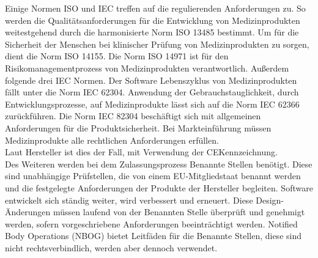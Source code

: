 Einige Normen ISO und IEC treffen auf die regulierenden Anforderungen zu.
So werden die Qualitätsanforderungen für die Entwicklung von Medizinprodukten weitestgehend durch die harmonisierte Norm ISO 13485 bestimmt. 
Um für die Sicherheit der Menschen bei klinischer Prüfung von Medizinprodukten zu sorgen, dient die Norm ISO 14155.
Die Norm ISO 14971 ist für den Risikomanagementprozess von Medizinprodukten verantwortlich.
Außerdem folgende drei IEC Normen.
Der Software Lebenszyklus von Medizinprodukten fällt unter die Norm IEC 62304. 
Anwendung der Gebrauchstauglichkeit, durch Entwicklungsprozesse,
auf Medizinprodukte lässt sich auf die Norm IEC 62366 zurückführen. 
Die Norm IEC 82304 beschäftigt sich mit allgemeinen Anforderungen für die Produktsicherheit.
Bei Markteinführung müssen Medizinprodukte alle rechtlichen Anforderungen erfüllen.\\ 
Laut Hersteller ist dies der Fall, mit Verwendung der CE\-Kennzeichnung.\cite{AI_in_EU}\\
Des Weiteren werden bei dem Zulassungsprozess Benannte Stellen benötigt. 
Diese sind unabhängige Prüfstellen, die von einem EU-Mitgliedstaat benannt werden und die festgelegte Anforderungen der Produkte der Hersteller begleiten. Software entwickelt sich ständig weiter, 
wird verbessert und erneuert. 
Diese Design-Änderungen müssen laufend von der Benannten Stelle überprüft und genehmigt werden, sofern vorgeschriebene Anforderungen beeinträchtigt werden. 
Notified Body Operations (NBOG) bietet Leitfäden für die Benannte Stellen, diese sind nicht rechtsverbindlich, werden aber dennoch verwendet.\cite{AI_in_EU}
